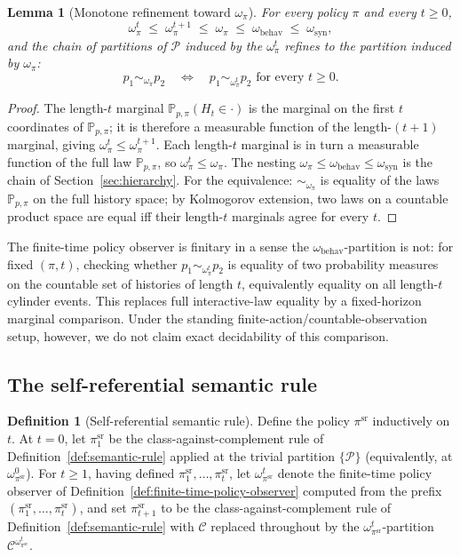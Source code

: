 \documentclass[11pt]{article}
\newtheorem{lemma}[theorem]{Lemma}
\theoremstyle{definition}
\newtheorem{definition}[theorem]{Definition}
\theoremstyle{remark}
\newcommand{\Ccal}{\mathcal{C}}
\newcommand{\Pcal}{\mathcal{P}}
\newcommand{\Prob}{\mathbb{P}}
\begin{document}
\begin{lemma}[Monotone refinement toward $\omega_\pi$]
\label{lem:monotone-refinement}
For every policy $\pi$ and every $t\ge 0$,
\[
\omega_\pi^t\;\le\;\omega_\pi^{t+1}\;\le\;\omega_\pi\;\le\;\omega_{\mathrm{behav}}\;\le\;\omega_{\mathrm{syn}},
\]
and the chain of partitions of $\Pcal$ induced by the $\omega_\pi^t$ refines to the partition induced by $\omega_\pi$:
\[
p_1\sim_{\omega_\pi}p_2\quad\Longleftrightarrow\quad p_1\sim_{\omega_\pi^t}p_2\text{ for every }t\ge 0.
\]
\end{lemma}

\begin{proof}
The length-$t$ marginal $\Prob_{p,\pi}(H_t\in\cdot)$ is the marginal on the first $t$ coordinates of $\Prob_{p,\pi}$; it is therefore a measurable function of the length-$(t+1)$ marginal, giving $\omega_\pi^t\le\omega_\pi^{t+1}$. Each length-$t$ marginal is in turn a measurable function of the full law $\Prob_{p,\pi}$, so $\omega_\pi^t\le\omega_\pi$. The nesting $\omega_\pi\le\omega_{\mathrm{behav}}\le\omega_{\mathrm{syn}}$ is the chain of Section~\ref{sec:hierarchy}. For the equivalence: $\sim_{\omega_\pi}$ is equality of the laws $\Prob_{p,\pi}$ on the full history space; by Kolmogorov extension, two laws on a countable product space are equal iff their length-$t$ marginals agree for every $t$.
\end{proof}

The finite-time policy observer is finitary in a sense the $\omega_{\mathrm{behav}}$-partition is not: for fixed $(\pi,t)$, checking whether $p_1\sim_{\omega_\pi^t}p_2$ is equality of two probability measures on the countable set of histories of length $t$, equivalently equality on all length-$t$ cylinder events. This replaces full interactive-law equality by a fixed-horizon marginal comparison. Under the standing finite-action/countable-observation setup, however, we do not claim exact decidability of this comparison.

\subsection{The self-referential semantic rule}
\label{sec:self-ref-rule}

\begin{definition}[Self-referential semantic rule]
\label{def:self-ref-rule}
Define the policy $\pi^{\mathrm{sr}}$ inductively on $t$. At $t=0$, let $\pi^{\mathrm{sr}}_1$ be the class-against-complement rule of Definition~\ref{def:semantic-rule} applied at the trivial partition $\{\Pcal\}$ (equivalently, at $\omega_{\pi^{\mathrm{sr}}}^0$). For $t\ge 1$, having defined $\pi^{\mathrm{sr}}_1,\dots,\pi^{\mathrm{sr}}_t$, let $\omega_{\pi^{\mathrm{sr}}}^t$ denote the finite-time policy observer of Definition~\ref{def:finite-time-policy-observer} computed from the prefix $(\pi^{\mathrm{sr}}_1,\dots,\pi^{\mathrm{sr}}_t)$, and set $\pi^{\mathrm{sr}}_{t+1}$ to be the class-against-complement rule of Definition~\ref{def:semantic-rule} with $\Ccal$ replaced throughout by the $\omega_{\pi^{\mathrm{sr}}}^t$-partition $\Ccal^{\omega_{\pi^{\mathrm{sr}}}^t}$.
\end{definition}
\end{document}
